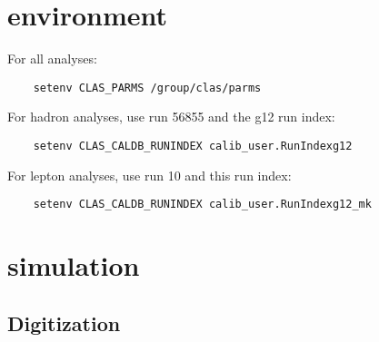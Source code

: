 \documentclass[10pt,twocolumn,oneside,letterpaper]{article}
\begin{document}
\renewcommand{\thefootnote}{\fnsymbol{footnote}}

\pagestyle{headings}


\section{environment}

\small

For all analyses:
\begin{verbatim}
    setenv CLAS_PARMS /group/clas/parms
\end{verbatim}
For hadron analyses, use run 56855 and the g12 run index:
\begin{verbatim}
    setenv CLAS_CALDB_RUNINDEX calib_user.RunIndexg12
\end{verbatim}
For lepton analyses, use run 10 and this run index:
\begin{verbatim}
    setenv CLAS_CALDB_RUNINDEX calib_user.RunIndexg12_mk
\end{verbatim}

\section{simulation}

\subsection{Digitization}
\end{document}
